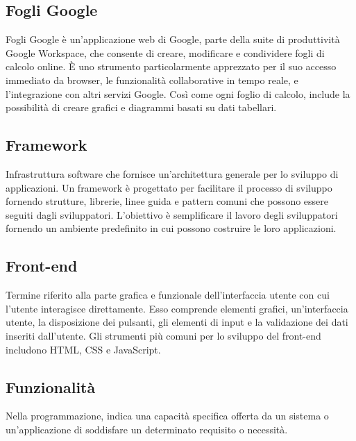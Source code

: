\subsection*{Fogli Google}
Fogli Google è un'applicazione web di Google, parte della suite di produttività Google Workspace, che consente di creare, modificare e condividere fogli 
di calcolo online. È uno strumento particolarmente apprezzato per il suo accesso immediato da browser, le funzionalità collaborative in tempo reale, e 
l'integrazione con altri servizi Google. Così come ogni foglio di calcolo, include la possibilità di creare grafici e diagrammi basati su dati tabellari.

\hypertarget{sec:framework}{}
\subsection*{Framework}
Infrastruttura software che fornisce un’architettura generale per lo sviluppo di applicazioni. Un framework è progettato per facilitare il processo di 
sviluppo fornendo strutture, librerie, linee guida e pattern comuni che possono essere seguiti dagli sviluppatori. L’obiettivo è semplificare il lavoro 
degli sviluppatori fornendo un ambiente predefinito in cui possono costruire le loro applicazioni.

\hypertarget{sec:front-end}{}
\subsection*{Front-end}
Termine riferito alla parte grafica e funzionale dell’interfaccia utente con cui l’utente interagisce direttamente. 
Esso comprende elementi grafici, un’interfaccia utente, la disposizione dei pulsanti, gli elementi di input e la 
validazione dei dati inseriti dall’utente. Gli strumenti più comuni per lo sviluppo del front-end includono HTML, 
CSS e JavaScript.

\hypertarget{sec:funzionalità}{}
\subsection*{Funzionalità}
Nella programmazione, indica una capacità specifica offerta da un sistema o un'applicazione di soddisfare un determinato requisito o necessità.

\newpage
